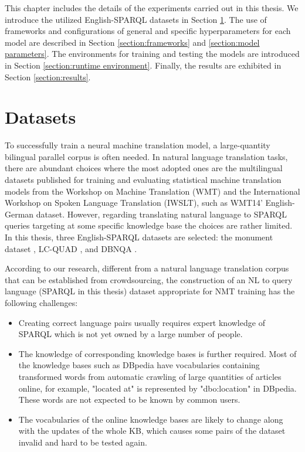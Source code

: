 
This chapter includes the details of the experiments carried out in this thesis. We introduce the utilized English-SPARQL datasets in Section \ref{section:datasets}. The use of frameworks and configurations of general and specific hyperparameters for each model are described in Section \ref{section:frameworks} and \ref{section:model parameters}. The environments for training and testing the models are introduced in Section \ref{section:runtime environment}. Finally, the results are exhibited in Section \ref{section:results}.

\section{Datasets} \label{section:datasets}

To successfully train a neural machine translation model, a large-quantity bilingual parallel corpus is often needed. In natural language translation tasks, there are abundant choices where the most adopted ones are the multilingual datasets published for training and evaluating statistical machine translation models from the Workshop on Machine Translation (WMT) and the International Workshop on Spoken Language Translation (IWSLT), such as WMT14' English-German dataset. However, regarding translating natural language to SPARQL queries targeting at some specific knowledge base the choices are rather limited. In this thesis, three English-SPARQL datasets are selected: the monument dataset \cite{Soru2018a}, LC-QUAD \cite{trivedi2017lc}, and DBNQA \cite{Soru2018dbnqa}.

According to our research, different from a natural language translation corpus that can be established from crowdsourcing, the construction of an NL to query language (SPARQL in this thesis) dataset appropriate for NMT training has the following challenges:
\begin{itemize}
\item Creating correct language pairs usually requires expert knowledge of SPARQL which is not yet owned by a large number of people. 
\item The knowledge of corresponding knowledge bases is further required. Most of the knowledge bases such as DBpedia have vocabularies containing transformed words from automatic crawling of large quantities of articles online, for example, "located at" is represented by "dbo:location" in DBpedia. These words are not expected to be known by common users.
\item The vocabularies of the online knowledge bases are likely to change along with the updates of the whole KB, which causes some pairs of the dataset invalid and hard to be tested again.
\end{itemize}

